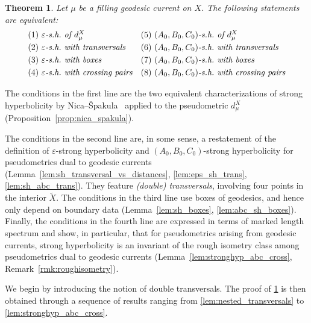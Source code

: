 \documentclass[12pt]{amsart}
\numberwithin{equation}{section}
\numberwithin{figure}{section}
\newtheorem{theorem}[equation]{Theorem}
\theoremstyle{definition}
\theoremstyle{plain}
\newcommand*{\wt}[1]{\widetilde{#1}}
\renewcommand{\epsilon}{\varepsilon}
\begin{document}
\begin{theorem}
Let $\mu$ be a filling geodesic current on $X$.
The following statements are equivalent:
\[
\begin{array}{ll}
(1)~\emph{$\epsilon$-s.h.\ of $d_\mu^X$}
& (5)~\emph{$(A_0,B_0,C_0)$-s.h.\ of $d_\mu^X$} \\[0.3em]

(2)~\emph{$\epsilon$-s.h.\ with transversals}
& (6)~\emph{$(A_0,B_0,C_0)$-s.h.\ with transversals} \\[0.3em]

(3)~\emph{$\epsilon$-s.h.\ with boxes}
& (7)~\emph{$(A_0,B_0,C_0)$-s.h.\ with boxes} \\[0.3em]

(4)~\emph{$\epsilon$-s.h.\ with crossing pairs}
& (8)~\emph{$(A_0,B_0,C_0)$-s.h.\ with crossing pairs}
\end{array}
\]
\label{thm:stronghyp_equivalent}
\end{theorem}

The conditions in the first line are the two equivalent characterizations of strong hyperbolicity by Nica--\v{S}pakula~\cite{NicaSpakula2016} applied to the pseudometric $d_\mu^X$ (Proposition~\ref{prop:nica_spakula}).

The conditions in the second line are, in some sense, a restatement of the definition of $\epsilon$-strong hyperbolicity and $(A_0,B_0,C_0)$-strong hyperbolicity for  pseudometrics dual to geodesic currents (Lemma~\ref{lem:sh_transversal_vs_distances}, \ref{lem:eps_sh_trans}, \ref{lem:sh_abc_trans}). They feature \emph{(double) transversals}, involving four points in the interior $\wt{X}$. The conditions in the third line use boxes of geodesics, and hence only depend on boundary data (Lemma~\ref{lem:sh_boxes}, \ref{lem:abc_sh_boxes}). Finally, the conditions in the fourth line are expressed in terms of marked length spectrum and show, in particular, that for pseudometrics arising from geodesic currents, strong hyperbolicity is an invariant of the rough isometry class among pseudometrics dual to geodesic currents (Lemma~\ref{lem:stronghyp_abc_cross}, Remark~\ref{rmk:roughisometry}).

We begin by introducing the notion of double transversals. The proof of \cref{thm:stronghyp_equivalent} is then obtained through a sequence of results ranging from \cref{lem:nested_transversals} to \cref{lem:stronghyp_abc_cross}.
\end{document}
